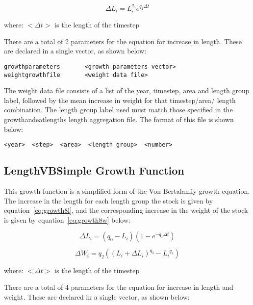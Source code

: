 \documentclass [a4paper, 10pt]{book}
\begin{document}
\begin{equation}\label{eq:growth7}
\Delta L_{i} = L_{i}^{q_{0}} e^{q_{1} \Delta t}
\end{equation}

where:\newline
$<\Delta t>$ is the length of the timestep

\bigskip
There are a total of 2 parameters for the equation for increase in length.  These are declared in a single vector, as shown below:

{\small\begin{verbatim}
growthparameters       <growth parameters vector>
weightgrowthfile       <weight data file>
\end{verbatim}}

The weight data file consists of a list of the year, timestep, area  and length group label, followed by the mean increase in weight for that timestep/area/ length combination.  The length group label used must match those specified in the growthandeatlengths length aggregation file.  The format of this file is shown below:

{\small\begin{verbatim}
<year>  <step>  <area>  <length group>  <number>
\end{verbatim}}

\subsection{LengthVBSimple Growth Function}\label{subsec:growth8}
This growth function is a simplified form of the Von Bertalanffy growth equation.  The increase in the length for each length group the stock is given by equation~\ref{eq:growth8l}, and the corresponding increase in the weight of the stock is given by equation~\ref{eq:growth8w} below:

\begin{equation}\label{eq:growth8l}
\Delta L_{i} = \left( q_{0} - L_{i} \right) \left( 1 - e^{-q_{1} \Delta t} \right)
\end{equation}

\begin{equation}\label{eq:growth8w}
\Delta W_{i} = q_{2} \left( \left( L_{i} + \Delta L_{i} \right) ^{q_{3}} - {L_{i}}^{q_{3}} \right)
\end{equation}

where:\newline
$<\Delta t>$ is the length of the timestep

\bigskip
There are a total of 4 parameters for the equation for increase in length and weight.  These are declared in a single vector, as shown below:
\end{document}

